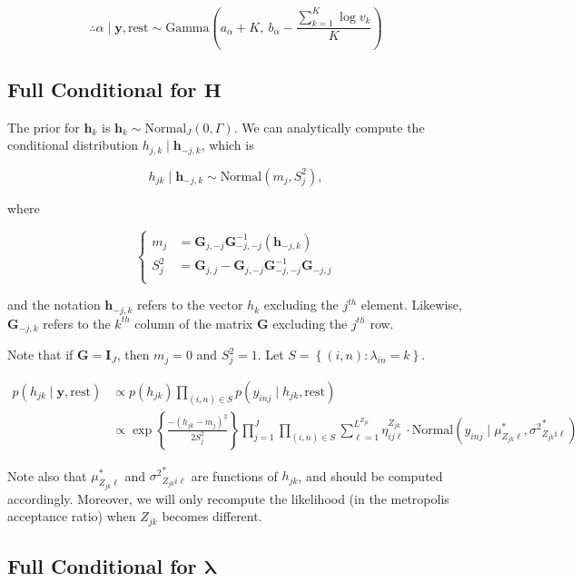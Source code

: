 \documentclass[12pt,]{article}
\newcommand{\p}[1]{\left(#1\right)}
\newcommand{\bc}[1]{ \left\{#1\right\} }
\newcommand{\N}{ \mathcal{N} }
\newcommand{\I}{\mathrm{\mathbf{I}}}
\def\N{\text{Normal}}
\def\G{\text{Gamma}}
\def\lin{\lambda_{in}}
\def\y{\bm{y}}
\def\mus{\mu^*}
\def\sss{{\sigma^2}^*}
\def\rest{\text{rest}}
\def\h{\bm{h}}
\begin{document}
\[
\therefore \alpha \mid \y, \rest \sim 
\G\p{a_\alpha + K,~ b_\alpha - \frac{\sum_{k=1}^K \log v_k}{K}}
\]

\subsection{\texorpdfstring{Full Conditional for
\(\bm H\)}{Full Conditional for \textbackslash{}bm H}}\label{full-conditional-for-bm-h}

The prior for \(\h_k\) is \(\h_k \sim \N_J(0, \Gamma)\). We can
analytically compute the conditional distribution
\(h_{j,k} \mid \h_{-j,k}\), which is

\[
h_{jk}  \mid \h_{-j,k} \sim \N(m_j, S^2_j),
\]

where

\[
\begin{cases}
m_j &= \bm G_{j,-j} \bm G_{-j,-j}^{-1}(\h_{-j,k})\\
S_j^2 &= \bm G_{j,j} - \bm G_{j,-j}\bm G_{-j,-j}^{-1}\bm G_{-j,j}\\
\end{cases}
\]

and the notation \(\h_{-j,k}\) refers to the vector \(h_k\) excluding
the \(j^{th}\) element. Likewise, \(\bm G_{-j,k}\) refers to the
\(k^{th}\) column of the matrix \(\bm G\) excluding the \(j^{th}\) row.

Note that if \(\bm G = \I_J\), then \(m_j=0\) and \(S_j^2 = 1\). Let
\(S = \bc{(i,n)\colon \lin=k}\).

\begin{align*}
p(h_{jk} \mid \y, \rest)  &\propto p(h_{jk}) \prod_{(i,n) \in S} p(y_{inj} \mid h_{jk}, \rest) \\
%
&\propto
\exp\bc{\frac{-(h_{jk} - m_j)^2}{2S_j^2}}
 \prod_{j=1}^J \prod_{(i,n)\in S}
\sum_{\ell=1}^{L^{Z_{jk}}} \eta^{Z_{jk}}_{ij\ell} \cdot
\N(y_{inj} \mid \mus_{Z_{jk}\ell}, \sss_{Z_{jk}i\ell})
\end{align*}


Note also that \(\mus_{Z_{jk}\ell}\) and \(\sss_{Z_{jk}i\ell}\) are
functions of \(h_{jk}\), and should be computed accordingly. Moreover,
we will only recompute the likelihood (in the metropolis acceptance
ratio) when \(Z_{jk}\) becomes different.  
\subsection{\texorpdfstring{Full Conditional for
\(\bm \lambda\)}{Full Conditional for \textbackslash{}bm \textbackslash{}lambda}}\label{full-conditional-for-bm-lambda}
\end{document}
